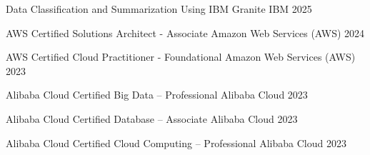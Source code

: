 

\begin{cvhonors}

  \cvhonor
    {Data Classification and Summarization Using IBM Granite} %
    {IBM} %
    {} %
    {2025} %

  \cvhonor
    {AWS Certified Solutions Architect - Associate} %
    {Amazon Web Services (AWS)} %
    {} %
    {2024} %

  \cvhonor
    {AWS Certified Cloud Practitioner - Foundational} %
    {Amazon Web Services (AWS)} %
    {} %
    {2023} %

  \cvhonor
    {Alibaba Cloud Certified Big Data – Professional} %
    {Alibaba Cloud} %
    {} %
    {2023} %

  \cvhonor
    {Alibaba Cloud Certified Database – Associate} %
    {Alibaba Cloud} %
    {} %
    {2023} %

  \cvhonor
    {Alibaba Cloud Certified Cloud Computing – Professional} %
    {Alibaba Cloud} %
    {} %
    {2023} %

\end{cvhonors}
